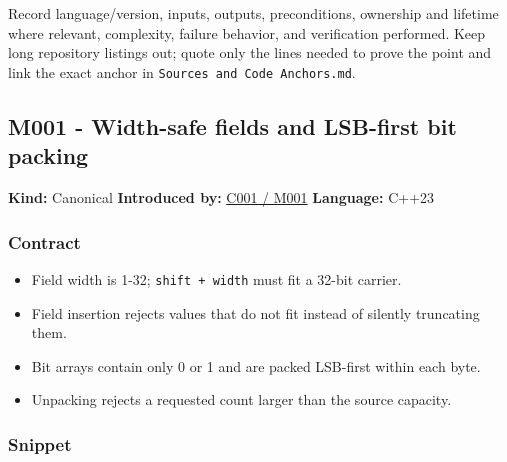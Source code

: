 Record language/version, inputs, outputs, preconditions, ownership and lifetime where relevant, complexity, failure behavior, and verification performed. Keep long repository listings out; quote only the lines needed to prove the point and link the exact anchor in \texttt{Sources\ and\ Code\ Anchors.md}.

\subsection{M001 - Width-safe fields and LSB-first bit packing}\label{appendix-4e2236f53445-m001---width-safe-fields-and-lsb-first-bit-packing}

\hypertarget{appendix-4e2236f53445-m001---width-safe-fields-and-lsb-first-bit-packing}{}

\textbf{Kind:} Canonical \textbf{Introduced by:} \hyperref[01-foundations-i-ch001-from-a-signal-to-an-interpretation]{C001 / M001} \textbf{Language:} C++23

\subsubsection{Contract}\label{appendix-4e2236f53445-contract}

\hypertarget{appendix-4e2236f53445-contract}{}

\begin{itemize}
\tightlist
\item
  Field width is 1-32; \texttt{shift\ +\ width} must fit a 32-bit carrier.
\item
  Field insertion rejects values that do not fit instead of silently truncating them.
\item
  Bit arrays contain only 0 or 1 and are packed LSB-first within each byte.
\item
  Unpacking rejects a requested count larger than the source capacity.
\end{itemize}

\subsubsection{Snippet}\label{appendix-4e2236f53445-snippet}

\hypertarget{appendix-4e2236f53445-snippet}{}

